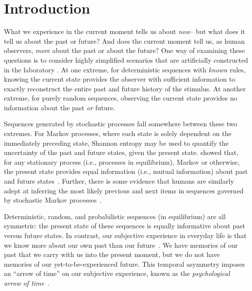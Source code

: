 \documentclass[10pt]{article}
\providecommand{\DIFaddbegin}{} %
\providecommand{\DIFaddend}{} %
\newcommand{\DIFaddincludegraphics}[2][]{{\color{blue}\fbox{\DIFOincludegraphics[#1]{#2}}}} %
\DeclareRobustCommand{\DIFaddbegin}{\DIFOaddbegin \let\includegraphics\DIFaddincludegraphics} %
\DeclareRobustCommand{\DIFaddend}{\DIFOaddend \let\includegraphics\DIFOincludegraphics} %
\begin{document}
\section*{Introduction} 
\DIFaddbegin 

\DIFaddend What we experience in the current moment tells us about \textit{now}-- but what
does it tell us about the past or future? And does the current moment tell us,
as human observers, \textit{more} about the past or about the future? One way
of examining these questions is to consider highly simplified scenarios that
are artificially constructed in the laboratory \citep[e.g., ][]{MaheEtal22}. At
one extreme, for deterministic sequences with \textit{known} rules, knowing the
current state provides the observer with sufficient information to exactly
reconstruct the entire past and future history of the stimulus. At another
extreme, for purely random sequences, observing the current state provides no
information about the past \textit{or} future.

Sequences generated by stochastic processes fall somewhere between these two
extremes. For Markov processes, where each state is solely dependent on the
immediately preceding state, Shannon entropy may be used to quantify the
uncertainty of the past and future states, given the present state.
\cite{Cove94} showed that, for any stationary process (i.e., processes in
equilibrium), Markov or otherwise, the present state provides equal information
(i.e., mutual information) about past and future states~\citep[also
see][]{BialEtal01, ElliEtal09}. Further, there is some evidence that humans are
similarly adept at inferring the most likely previous and next items in
sequences governed by stochastic Markov processes~\citep{JonePash07}.

Deterministic, random, and probabilistic sequences (in equilibrium) are all
symmetric: the present state of these sequences is equally informative about
past versus future states. In contrast, our subjective experience in everyday
life is that we know more about our own past than our
future~\citep[e.g.,][]{Horw87}. We have memories of our past that we carry with
us into the present moment, but we do not have memories of our
yet-to-be-experienced future. This temporal asymmetry imposes an ``arrow of
time'' on our subjective experience, known as the \textit{psychological arrow
of time}~\citep[e.g.,][]{Hawk85}.
\end{document}
